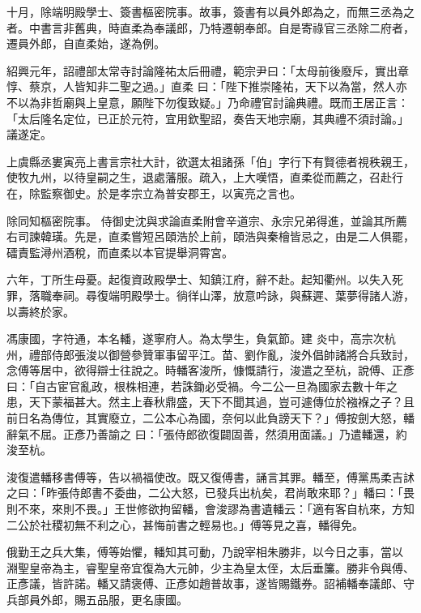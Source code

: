 \begin{pinyinscope}
 十月，除端明殿學士、簽書樞密院事。故事，簽書有以員外郎為之，而無三丞為之者。中書言非舊典，時直柔為奉議郎，乃特遷朝奉郎。自是寄祿官三丞除二府者，遷員外郎，自直柔始，遂為例。



 紹興元年，詔禮部太常寺討論隆祐太后冊禮，範宗尹曰：「太母前後廢斥，實出章惇、蔡京，人皆知非二聖之過。」直柔
 曰：「陛下推崇隆祐，天下以為當，然人亦不以為非哲廟與上皇意，願陛下勿復致疑。」乃命禮官討論典禮。既而王居正言：「太后隆名定位，已正於元符，宜用欽聖詔，奏告天地宗廟，其典禮不須討論。」議遂定。



 上虞縣丞婁寅亮上書言宗社大計，欲選太祖諸孫「伯」字行下有賢德者視秩親王，使牧九州，以待皇嗣之生，退處藩服。疏入，上大嘆悟，直柔從而薦之，召赴行在，除監察御史。於是孝宗立為普安郡王，以寅亮之言也。



 除同知樞密院事。
 侍御史沈與求論直柔附會辛道宗、永宗兄弟得進，並論其所薦右司諫韓璜。先是，直柔嘗短呂頤浩於上前，頤浩與秦檜皆忌之，由是二人俱罷，礌責監潯州酒稅，而直柔以本官提舉洞霄宮。



 六年，丁所生母憂。起復資政殿學士、知鎮江府，辭不赴。起知衢州。以失入死罪，落職奉祠。尋復端明殿學士。徜徉山澤，放意吟詠，與蘇遲、葉夢得諸人游，以壽終於家。



 馮康國，字符通，本名轓，遂寧府人。為太學生，負氣節。建
 炎中，高宗次杭州，禮部侍郎張浚以御營參贊軍事留平江。苗、劉作亂，浚外倡帥諸將合兵致討，念傅等居中，欲得辯士往說之。時轓客浚所，慷慨請行，浚遣之至杭，說傅、正彥曰：「自古宦官亂政，根株相連，若誅鋤必受禍。今二公一旦為國家去數十年之患，天下蒙福甚大。然主上春秋鼎盛，天下不聞其過，豈可遽傳位於襁褓之子？且前日名為傳位，其實廢立，二公本心為國，奈何以此負謗天下？」傅按劍大怒，轓辭氣不屈。正彥乃善諭之
 曰：「張侍郎欲復闢固善，然須用面議。」乃遣轓還，約浚至杭。



 浚復遣轓移書傅等，告以禍福使改。既又復傅書，誦言其罪。轓至，傅黨馬柔吉訹之曰：「昨張侍郎書不委曲，二公大怒，已發兵出杭矣，君尚敢來耶？」轓曰：「畏則不來，來則不畏。」王世修欲拘留轓，會浚謬為書遺轓云：「適有客自杭來，方知二公於社稷初無不利之心，甚悔前書之輕易也。」傅等見之喜，轓得免。



 俄勤王之兵大集，傅等始懼，轓知其可動，乃說宰相朱勝非，以今日之事，當以
 淵聖皇帝為主，睿聖皇帝宜復為大元帥，少主為皇太侄，太后垂簾。勝非令與傅、正彥議，皆許諾。轓又請褒傅、正彥如趙普故事，遂皆賜鐵券。詔補轓奉議郎、守兵部員外郎，賜五品服，更名康國。




\end{pinyinscope}
